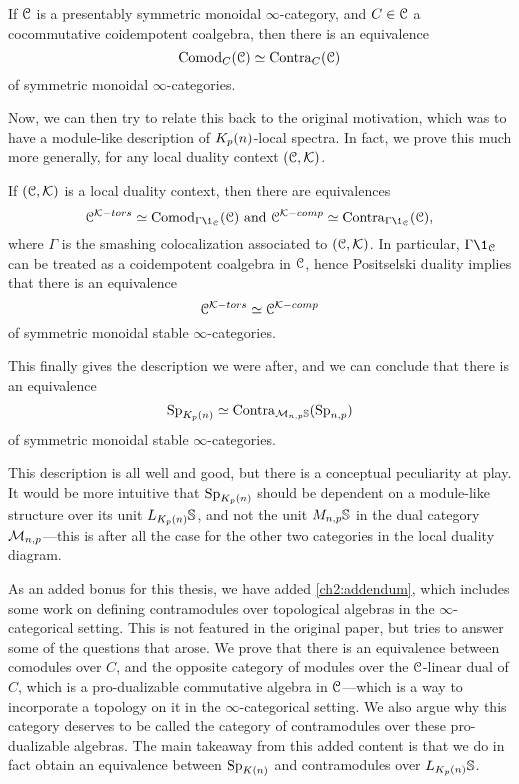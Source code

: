 \begin{theorem}
    If $\EuScript{C}$ is a presentably symmetric monoidal $\infty$-category, and $C\in \EuScript{C}$ a cocommutative coidempotent coalgebra, then there is an equivalence 
    \[\mathrm{Comod}_C(\EuScript{C})\simeq \mathrm{Contra}_C(\EuScript{C})\]
    of symmetric monoidal $\infty$-categories. 
\end{theorem}

Now, we can then try to relate this back to the original motivation, which was to have a module-like description of ${K_p(n)}$-local spectra. In fact, we prove this much more generally, for any local duality context $(\EuScript{C}, \mathcal{K})$. 

\begin{theorem}
    If $(\EuScript{C}, \mathcal{K})$ is a local duality context, then there are equivalences 
    \[\C^{\K-tors}\simeq \Comod_{\Gamma \1_\C}(\C) \text{ and } \C^{\K-comp}\simeq \Contra_{\Gamma \1_\C}(\C),\]
    where $\Gamma$ is the smashing colocalization associated to $(\EuScript{C}, \mathcal{K})$. In particular, $\Gamma \1_\C$ can be treated as a coidempotent coalgebra in $\EuScript{C}$, hence Positselski duality implies that there is an equivalence 
    \[\EuScript{C}^{\mathcal{K}-tors}\simeq \EuScript{C}^{\mathcal{K}-comp}\]
    of symmetric monoidal stable $\infty$-categories. 
\end{theorem}

This finally gives the description we were after, and we can conclude that there is an equivalence 
\[\mathrm{Sp}_{K_p(n)} \simeq \mathrm{Contra}_{\mathcal{M}_{n,p} \mathbb{S}}(\mathrm{Sp}_{n,p})\]
of symmetric monoidal stable $\infty$-categories. 

This description is all well and good, but there is a conceptual peculiarity at play. It would be more intuitive that $\mathrm{Sp}_{K_p(n)}$ should be dependent on a module-like structure over its unit $L_{K_p(n)} \mathbb{S}$, and not the unit $M_{n,p} \mathbb{S}$ in the dual category $\mathcal{M}_{n,p}$---this is after all the case for the other two categories in the local duality diagram. 

As an added bonus for this thesis, we have added \cref{ch2:addendum}, which includes some work on defining contramodules over topological algebras in the $\infty$-categorical setting. This is not featured in the original paper, but tries to answer some of the questions that arose. We prove that there is an equivalence between comodules over $C$, and the opposite category of modules over the $\EuScript{C}$-linear dual of $C$, which is a pro-dualizable commutative algebra in $\EuScript{C}$---which is a way to incorporate a topology on it in the $\infty$-categorical setting. We also argue why this category deserves to be called the category of contramodules over these pro-dualizable algebras. The main takeaway from this added content is that we do in fact obtain an equivalence between $\mathrm{Sp}_{{K(n)}}$ and contramodules over $L_{K_p(n)}\mathbb{S}$. 









